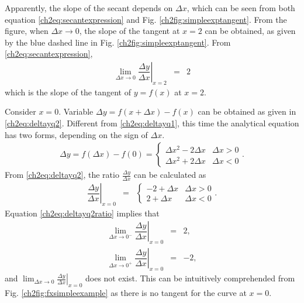 Apparently, the slope of the secant depends on $\Delta x$, which can be seen from both equation \eqref{ch2eq:secantexpression} and Fig. \ref{ch2fig:simpleexptangent}. From the figure, when $\Delta x \rightarrow 0$, the slope of the tangent at $x=2$ can be obtained, as given by the blue dashed line in Fig. \ref{ch2fig:simpleexptangent}. From \eqref{ch2eq:secantexpression},
\begin{eqnarray}
  \lim_{\Delta x \rightarrow 0} \left.\dfrac{\Delta y}{\Delta x}\right|_{x=2} &=& 2 \label{ch2eq:simpleexampleratioxtwo}
\end{eqnarray}
which is the slope of the tangent of $y=f(x)$ at $x=2$.

Consider $x=0$. Variable $\Delta y = f\left(x+\Delta x\right) - f(x)$ can be obtained as given in \eqref{ch2eq:deltayq2}. Different from \eqref{ch2eq:deltayq1}, this time the analytical equation has two forms, depending on the sign of $\Delta x$.
\begin{eqnarray}
  \Delta y = f\left(\Delta x\right) - f(0) = \left\{\begin{array}{cc}
                                                      \Delta x^2 - 2\Delta x & \Delta x > 0 \\
                                                      \Delta x^2 + 2\Delta x & \Delta x < 0
                                                    \end{array}\right.. \label{ch2eq:deltayq2}
\end{eqnarray}
From \eqref{ch2eq:deltayq2}, the ratio $\frac{\Delta y}{\Delta x}$ can be calculated as
\begin{eqnarray}
  \left.\dfrac{\Delta y}{\Delta x}\right|_{x=0} &=& \left\{\begin{array}{cc}
                                          -2 + \Delta x & \Delta x > 0 \\
                                          2 + \Delta x & \Delta x < 0
                                        \end{array}\right.. \label{ch2eq:deltayq2ratio}
\end{eqnarray}
Equation \eqref{ch2eq:deltayq2ratio} implies that
\begin{eqnarray}
  \lim_{\Delta x\rightarrow 0^-} \left.\dfrac{\Delta y}{\Delta x}\right|_{x=0} &=& 2, \nonumber \\
  \lim_{\Delta x\rightarrow 0^+} \left.\dfrac{\Delta y}{\Delta x}\right|_{x=0} &=& -2, \nonumber
\end{eqnarray}
and $\lim_{\Delta x\rightarrow 0}\left.\frac{\Delta y}{\Delta x}\right|_{x=0}$ does not exist. This can be intuitively comprehended from Fig. \ref{ch2fig:fxsimpleexample} as there is no tangent for the curve at $x=0$.

